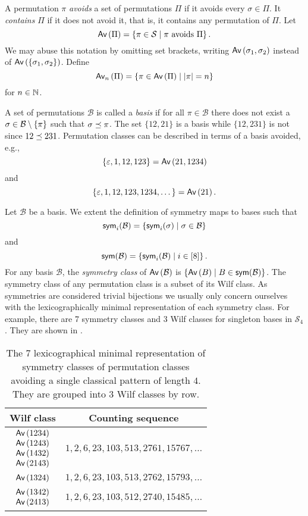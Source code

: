 A permutation $\pi$ \emph{avoids} a set of permutations $\Pi$ if it avoids every $\sigma \in \Pi$. It \emph{contains} $\Pi$ if it does not avoid it, that is, it contains any permutation of $\Pi$. Let 
\[
    \Av{\Pi} = \cset{\pi \in \mathcal{S}}{\pi \text{ avoids } \Pi}.
\]
We may abuse this notation by omitting set brackets, writing $\Av{\sigma_1,\sigma_2}$ instead of $\Av{\set{\sigma_1,\sigma_2}}$. Define \[
    \Avn{n}{\Pi} = \cset{\pi \in \Av{\Pi}}{|\pi| = n}
\]
for $n\in\N$.

A set of permutations $\mathcal{B}$ is called a \emph{basis} if for all $\pi\in\mathcal{B}$ there does not exist a $\sigma \in \mathcal{B} \setminus \set{\pi}$ such that $\contains{\pi}{\sigma}$. The set $\{12,21\}$ is a basis while $\{12,231\}$ is not since $\contains{231}{12}$. Permutation classes can be described in terms of a basis avoided, e.g., 
\[
    \{\varepsilon,1,12,123\} = \Av{21, 1234}
\]
and
\[
    \{\varepsilon, 1, 12, 123, 1234,\dotsc\} = \Av{21}.
\]

Let $\mathcal{B}$ be a basis. We extent the definition of symmetry maps to bases such that
\[
    \sym_i(\mathcal{B}) = \cset{\sym_i(\sigma)}{\sigma \in \mathcal{B}}
\]
and
\[
    \sym(\mathcal{B}) = \cset{\sym_i(\mathcal{B})}{i \in [8]}.
\]
For any basis $\mathcal{B}$, the \emph{symmetry class} of $\Av{\mathcal{B}}$ is $\cset{\Av{B}}{B \in \sym(\mathcal{B})}$. The symmetry class of any permutation class is a subset of its Wilf class. As symmetries are considered trivial bijections we usually only concern ourselves with the lexicographically minimal representation of each symmetry class. For example, there are 7 symmetry classes and 3 Wilf classes for singleton bases in $\mathcal{S}_4$. They are shown in .

\begin{table}[ht!]
    \centering
    \begin{tabular}{c|c}
        Wilf class & Counting sequence\\
        \hline
        $\begin{matrix}\Av{1234}\\\Av{1243}\\\Av{1432}\\\Av{2143}\end{matrix}$ & $1, 2, 6, 23, 103, 513, 2761, 15767, \dotsc$ \\
        \hline
        $\begin{matrix}\Av{1324}\end{matrix}$ & $1, 2, 6, 23, 103, 513, 2762, 15793,\dotsc$\\
        \hline
        $\begin{matrix}\Av{1342}\\\Av{2413}\end{matrix}$ & $1, 2, 6, 23, 103, 512, 2740, 15485,\dotsc$
    \end{tabular}
    \caption{The $7$ lexicographical minimal representation of symmetry classes of permutation classes avoiding a single classical pattern of length $4$. They are grouped into $3$ Wilf classes by row.}
    \label{tab:wilfcls4}
\end{table}




